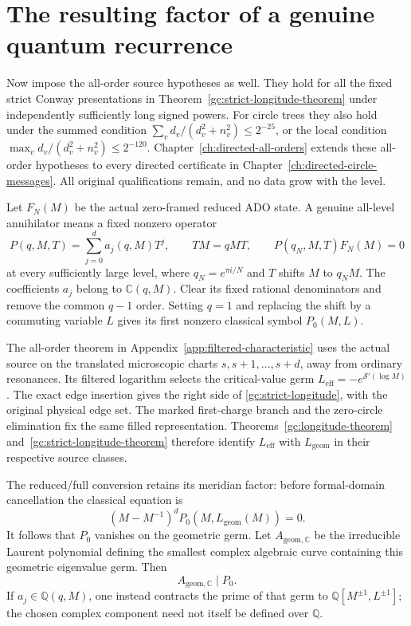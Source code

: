 \section{The resulting factor of a genuine quantum recurrence}
\label{gc:operator}

Now impose the all-order source hypotheses as well. They hold for
all the fixed strict Conway presentations in
Theorem~\ref{gc:strict-longitude-theorem} under independently
sufficiently long signed powers. For circle trees they also hold
under the summed condition
$\sum_vd_v/(d_v^2+n_v^2)\le2^{-25}$, or the local condition
$\max_vd_v/(d_v^2+n_v^2)\le2^{-120}$.
Chapter~\ref{ch:directed-all-orders} extends these all-order hypotheses to every directed certificate in Chapter~\ref{ch:directed-circle-messages}. All original qualifications remain, and no data grow with the level.

Let $F_N(M)$ be the actual zero-framed reduced ADO state. A genuine
all-level annihilator means a fixed nonzero operator
\begin{equation}\label{gc:operator-definition}
 P(q,M,T)=\sum_{j=0}^d a_j(q,M)T^j,\qquad
 TM=qMT,\qquad
 P(q_N,M,T)F_N(M)=0
\end{equation}
at every sufficiently large level, where
$q_N=e^{\pi i/N}$ and $T$ shifts $M$ to $q_NM$.
The coefficients $a_j$ belong to $\mathbb C(q,M)$.
Clear its fixed rational denominators and remove the common
$q-1$ order. Setting $q=1$ and replacing the shift by a
commuting variable $L$ gives its first nonzero classical symbol
$P_0(M,L)$.

The all-order theorem in Appendix~\ref{app:filtered-characteristic}
uses the actual source on the translated microscopic charts
$s,s+1,\ldots,s+d$, away from ordinary resonances.
Its filtered logarithm selects the critical-value germ
$L_{\mathrm{eff}}=-e^{\mathcal S'(\log M)}$.
The exact edge insertion gives the right side of
\eqref{gc:strict-longitude}, with the original physical edge set.
The marked first-charge branch and the zero-circle elimination
fix the same filled representation. Theorems~\ref{gc:longitude-theorem}
and~\ref{gc:strict-longitude-theorem} therefore identify
$L_{\mathrm{eff}}$ with $L_{\mathrm{geom}}$ in their respective
source classes.

The reduced/full conversion retains its meridian factor: before
formal-domain cancellation the classical equation is
\begin{equation}\label{gc:meridian-factor}
 (M-M^{-1})^d P_0(M,L_{\mathrm{geom}}(M))=0.
\end{equation}
It follows that $P_0$ vanishes on the geometric germ.
Let $A_{\mathrm{geom},\mathbb C}$ be the irreducible Laurent
polynomial defining the smallest complex algebraic curve containing
this geometric eigenvalue germ. Then
\begin{equation}\label{gc:factor}
                     A_{\mathrm{geom},\mathbb C}\mid P_0.
\end{equation}
If $a_j\in\mathbb Q(q,M)$, one instead contracts the prime of
that germ to
$\mathbb Q[M^{\pm1},L^{\pm1}]$; the chosen complex component
need not itself be defined over $\mathbb Q$.

